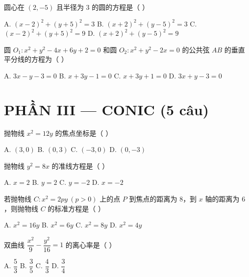 \documentclass[11pt, a4paper]{article}
\begin{document}
\begin{baitap}[20]
圆心在 $(2,-5)$ 且半径为 $3$ 的圆的方程是（ ）
\par\vspace{3pt}
\noindent A. $(x-2)^2 + (y+5)^2 = 3$ \quad B. $(x+2)^2 + (y-5)^2 = 3$ \quad C. $(x-2)^2 + (y+5)^2 = 9$ \quad D. $(x+2)^2 + (y-5)^2 = 9$
\end{baitap}

\begin{baitap}[21]
圆 $O_1: x^2 + y^2 - 4x + 6y + 2 = 0$ 和圆 $O_2: x^2 + y^2 - 2x = 0$ 的公共弦 $AB$ 的垂直平分线的方程为（ ）
\par\vspace{3pt}
\noindent A. $3x - y - 3 = 0$ \quad B. $x + 3y - 1 = 0$ \quad C. $x + 3y + 1 = 0$ \quad D. $3x + y - 3 = 0$
\end{baitap}

\section{PHẦN III — CONIC (5 câu)}

\begin{baitap}[22]
抛物线 $x^2 = 12y$ 的焦点坐标是（ ）
\par\vspace{3pt}
\noindent A. $(3,0)$ \quad B. $(0,3)$ \quad C. $(-3,0)$ \quad D. $(0,-3)$
\end{baitap}

\begin{baitap}[23]
抛物线 $y^2 = 8x$ 的准线方程是（ ）
\par\vspace{3pt}
\noindent A. $x = 2$ \quad B. $y = 2$ \quad C. $y = -2$ \quad D. $x = -2$
\end{baitap}

\begin{baitap}[24]
若抛物线 $C: x^2 = 2py\ (p > 0)$ 上的点 $P$ 到焦点的距离为 $8$，到 $x$ 轴的距离为 $6$，则抛物线 $C$ 的标准方程是（ ）
\par\vspace{3pt}
\noindent A. $x^2 = 16y$ \quad B. $x^2 = 6y$ \quad C. $x^2 = 8y$ \quad D. $x^2 = 4y$
\end{baitap}

\begin{baitap}[25]
双曲线 $\dfrac{x^2}{9} - \dfrac{y^2}{16} = 1$ 的离心率是（ ）
\par\vspace{3pt}
\noindent A. $\dfrac{5}{3}$ \quad B. $\dfrac{3}{5}$ \quad C. $\dfrac{4}{3}$ \quad D. $\dfrac{3}{4}$
\end{baitap}
\end{document}
